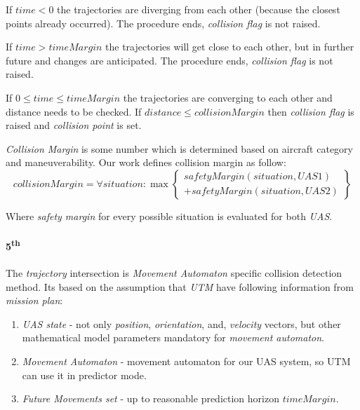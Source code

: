 \noindent If $time < 0$ the trajectories are diverging from each other (because the closest points already occurred). The procedure ends, \emph{collision flag} is not raised.

If $time > time Margin$ the trajectories will get close to each other, but in further future and changes are anticipated. The procedure ends, \emph{collision flag} is not raised.

If $0 \le time \le timeMargin$ the trajectories are converging to each other and distance needs to be checked. If $distance \le collisionMargin$ then \emph{collision flag} is raised and \emph{collision point} is set.

\begin{note}
    \emph{Collision Margin} is some number which is determined based on aircraft category and maneuverability. Our work defines collision margin as follow:
    \begin{equation}
        collisionMargin = \forall situation : \max\left\{\begin{gathered}safetyMargin(situation,UAS1)\\ +safetyMargin(situation,UAS2) \end{gathered}\right\}
    \end{equation}
    
    Where \emph{safety margin} for every possible situation is evaluated for both \emph{UAS}.
\end{note}

\paragraph{5\textsuperscript{th}} The \emph{trajectory} intersection is \emph{Movement Automaton} specific collision detection method. Its based on the assumption that \emph{UTM} have following information from \emph{mission plan}:
\begin{enumerate}
    \item \emph{UAS state} - not only \emph{position}, \emph{orientation}, and, \emph{velocity} vectors, but other mathematical model parameters mandatory for \emph{movement automaton}.
    
    \item \emph{Movement Automaton} - movement automaton for our UAS system, so UTM can use it in predictor mode.
    
    \item \emph{Future Movements set} - up to reasonable prediction horizon $timeMargin$. 
\end{enumerate}

